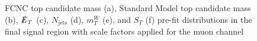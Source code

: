 \begin{figure}[]
\hfil  
{}
\caption{FCNC top candidate mass (a), Standard Model top candidate mass (b), $\slashed{E}_T$ (c), $N_\text{jets}$ (d),  $m_T^W$ (e), and $S_T$ (f) pre-fit distributions in the final signal region with scale factors applied for the muon channel}
\label{fig:SRmuj2}
\end{figure}

